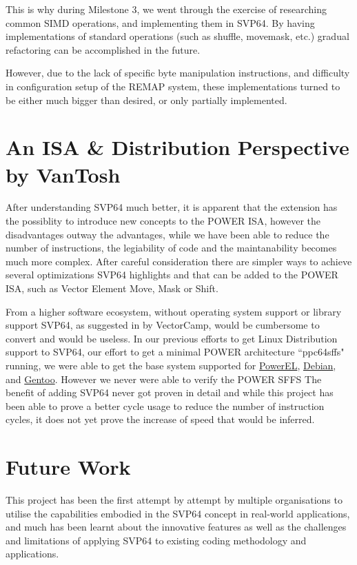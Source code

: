 This is why during Milestone 3, we went through the exercise of researching
common SIMD operations, and implementing them in SVP64. By having
implementations of standard operations (such as shuffle, movemask, etc.)
gradual refactoring can be accomplished in the future.

However, due to the lack of specific byte manipulation instructions, and
difficulty in configuration setup of the REMAP system, these implementations
turned to be either much bigger than desired, or only partially implemented.


\section{An ISA \& Distribution Perspective by VanTosh}

After understanding SVP64 much better, it is apparent that the extension has
the possiblity to introduce new concepts to the \acrshort{POWER} \acrshort{ISA},
however the disadvantages outway the advantages, while we have been able to
reduce the number of instructions, the legiability of code and the maintanability
becomes much more complex.
After careful consideration there are simpler ways to achieve several optimizations
SVP64 highlights and that can be added to the \acrshort{POWER} \acrshort{ISA},
such as Vector Element Move, Mask or Shift.

From a higher software ecosystem, without operating system support or library support
SVP64, as suggested in \label{sec:vecotorscansoftwareperspective} by VectorCamp,
would be cumbersome to convert and would be useless.
In our previous efforts to get Linux Distribution support to SVP64, our effort to
get a minimal \acrshort{POWER} architecture ``ppc64sffs" running, we were able
to get the base system supported for \href{https://www.powerel.org}{PowerEL},
\href{https://www.debian.org}{Debian}, and \href{https://gentoo.org}{Gentoo}.
However we never were able to verify the \acrshort{POWER} \acrfull{SFFS}
The benefit of adding SVP64 never got proven in detail and while this project
has been able to prove a better cycle usage to reduce the number of instruction
cycles, it does not yet prove the increase of speed that would be inferred.

\section{Future Work}

This project has been the first attempt by attempt by multiple organisations
to utilise the capabilities embodied in the SVP64 concept in real-world
applications, and much has been learnt about the innovative features as well
as the challenges and limitations of applying SVP64 to existing
coding methodology and applications.

